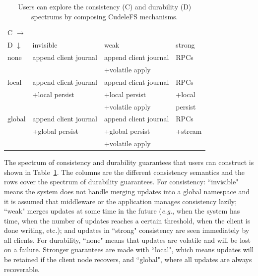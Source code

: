 \begin{table}[t]
\begin{center}
\begin{tabular}{ l | l | l | l }
  C \(\rightarrow\) &&& \\  
  D \(\downarrow\)  	     & invisible         & weak        & strong  \\\hline
  none                       & append client journal            & append client journal          & RPCs    \\
                             &                   & +volatile apply &         \\\hdashline
  local                      & append client journal            & append client journal          & RPCs    \\
                             & +local persist    & +local persist  & +local  \\
                             &                   & +volatile apply &  persist\\\hdashline
  global                     & append client journal            & append client journal          & RPCs    \\
                             & +global persist   & +global persist & +stream \\
                             &                   & +volatile apply &         \\
\end{tabular}

\caption{Users can explore the consistency (C) and
durability (D) spectrums by composing CudeleFS mechanisms. 
\label{table:spectrum}}
\end{center}
\end{table}



The spectrum of consistency and durability guarantees that users can
construct is shown in Table~\ref{table:spectrum}. The columns are the different
consistency semantics and the rows cover the spectrum of durability guarantees.
For consistency: ``invisible" means the system does not handle merging updates
into a global namespace and it is assumed that middleware or the application
manages consistency lazily; ``weak" merges updates at some time in the
future ({\it e.g.}, when the system has time, when the number of updates reaches a
certain threshold, when the client is done writing, etc.); and updates in
``strong" consistency are seen immediately by all clients. For durability,
``none" means that updates are volatile and will be lost on a failure. Stronger
guarantees are made with ``local", which means updates will be retained if the
client node recovers, and ``global", where all updates are always recoverable.

